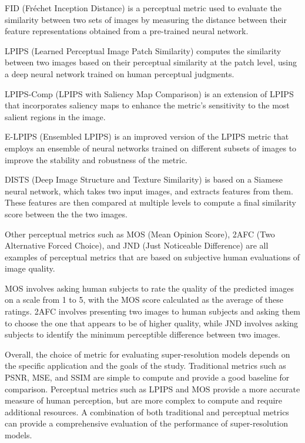 FID (Fréchet Inception Distance) is a perceptual metric used to evaluate the similarity between two sets of images by measuring the distance between their feature representations obtained from a pre-trained neural network.

LPIPS (Learned Perceptual Image Patch Similarity) computes the similarity between two images based on their perceptual similarity at the patch level, using a deep neural network trained on human perceptual judgments.

LPIPS-Comp (LPIPS with Saliency Map Comparison) is an extension of LPIPS that incorporates saliency maps to enhance the metric's sensitivity to the most salient regions in the image.

E-LPIPS (Ensembled LPIPS) is an improved version of the LPIPS metric that employs an ensemble of neural networks trained on different subsets of images to improve the stability and robustness of the metric.

DISTS (Deep Image Structure and Texture Similarity) is based on a Siamese neural network, which takes two input images, and extracts features from them. These features are then compared at multiple levels to compute a final similarity score between the the two images.

Other perceptual metrics such as MOS (Mean Opinion Score), 2AFC (Two Alternative Forced Choice), and JND (Just Noticeable Difference) are all examples of perceptual metrics that are based on subjective human evaluations of image quality.

MOS involves asking human subjects to rate the quality of the predicted images on a scale from 1 to 5, with the MOS score calculated as the average of these ratings. 2AFC involves presenting two images to human subjects and asking them to choose the one that appears to be of higher quality, while JND involves asking subjects to identify the minimum perceptible difference between two images.

Overall, the choice of metric for evaluating super-resolution models depends on the specific application and the goals of the study. Traditional metrics such as PSNR, MSE, and SSIM are simple to compute and provide a good baseline for comparison. Perceptual metrics such as LPIPS and MOS provide a more accurate measure of human perception, but are more complex to compute and require additional resources. A combination of both traditional and perceptual metrics can provide a comprehensive evaluation of the performance of super-resolution models.

